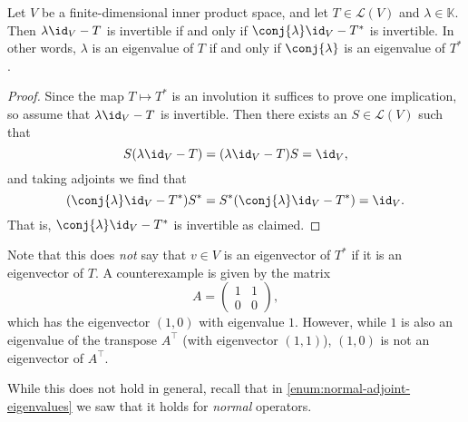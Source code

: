 \documentclass[a4paper, 11pt]{memoir}
\numberwithin{equation}{chapter}
\newcommand{\calL}{\mathcal{L}}
\newcommand{\trans}{^{\top}}
\begin{document}
\begin{proposition}
    Let $V$ be a finite-dimensional inner product space, and let $T \in \calL(V)$ and $\lambda \in \mathbb{K}$. Then $\lambda \id_V - T$ is invertible if and only if $\conj{\lambda} \id_V - T^*$ is invertible. In other words, $\lambda$ is an eigenvalue of $T$ if and only if $\conj{\lambda}$ is an eigenvalue of $T^*$.
\end{proposition} %

\begin{proof}
    Since the map $T \mapsto T^*$ is an involution it suffices to prove one implication, so assume that $\lambda \id_V - T$ is invertible. Then there exists an $S \in \calL(V)$ such that
    \begin{equation*}
        S(\lambda \id_V - T)
            = (\lambda \id_V - T)S
            = \id_V,
    \end{equation*}
    and taking adjoints we find that
    \begin{equation*}
        (\conj{\lambda} \id_V - T^*)S^*
            = S^*(\conj{\lambda} \id_V - T^*)
            = \id_V.
    \end{equation*}
    That is, $\conj{\lambda} \id_V - T^*$ is invertible as claimed.
\end{proof}

\begin{remark}
    Note that this does \emph{not} say that $v \in V$ is an eigenvector of $T^*$ if it is an eigenvector of $T$. A counterexample is given by the matrix
    \begin{equation*}
        A =
        \begin{pmatrix}
            1 & 1 \\
            0 & 0
        \end{pmatrix},
    \end{equation*}
    which has the eigenvector $(1,0)$ with eigenvalue $1$. However, while $1$ is also an eigenvalue of the transpose $A\trans$ (with eigenvector $(1,1)$), $(1,0)$ is not an eigenvector of $A\trans$.

    While this does not hold in general, recall that in \cref{enum:normal-adjoint-eigenvalues} we saw that it holds for \emph{normal} operators.
\end{remark}
\end{document}

